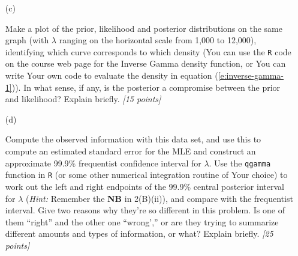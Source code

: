 \documentclass[12pt]{article}
\begin{document}
\begin{itemize}
\begin{itemize}
\begin{itemize}
\bigskip

\item[(c)] 

Make a plot of the prior, likelihood and posterior distributions on the same graph (with $\lambda$ ranging on the horizontal scale from 1,000 to 12,000), identifying which curve corresponds to which density (You can use the \texttt{R} code on the course web page for the Inverse Gamma density function, or You can write Your own code to evaluate the density in equation (\ref{e:inverse-gamma-1})). In what sense, if any, is the posterior a compromise between the prior and likelihood? Explain briefly. \textit{[15 points]}

\item[(d)] 

Compute the observed information with this data set, and use this to compute an estimated standard error for the MLE and construct an approximate 99.9\% frequentist confidence interval for $\lambda$. Use the \texttt{qgamma} function in \texttt{R} (or some other numerical integration routine of Your choice) to work out the left and right endpoints of the 99.9\% central posterior interval for $\lambda$ (\textit{Hint:} Remember the \textbf{NB} in 2(B)(ii)), and compare with the frequentist interval. Give two reasons why they're so different in this problem. Is one of them ``right'' and the other one ``wrong','' or are they trying to summarize different amounts and types of information, or what? Explain briefly. \textit{[25 points]}

\end{itemize}

\end{itemize}

\end{itemize}
\end{document}
